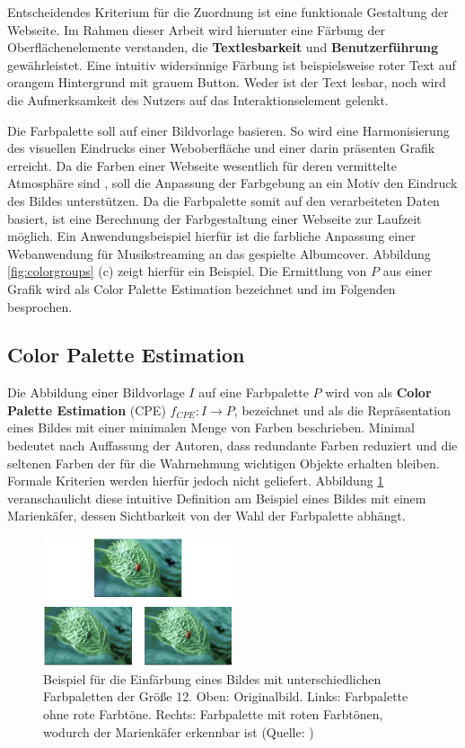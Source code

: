 Entscheidendes Kriterium für die Zuordnung  ist eine funktionale Gestaltung der Webseite. Im Rahmen dieser Arbeit wird hierunter eine Färbung der Oberflächenelemente verstanden, die \textbf{Textlesbarkeit} und \textbf{Benutzerführung} gewährleistet. Eine intuitiv widersinnige Färbung ist beispielsweise roter Text auf orangem Hintergrund mit grauem Button. Weder ist der Text lesbar, noch wird die Aufmerksamkeit des Nutzers auf das Interaktionselement gelenkt.

Die Farbpalette soll auf einer Bildvorlage basieren. So wird eine Harmonisierung des visuellen Eindrucks einer Weboberfläche und einer darin präsenten Grafik erreicht. Da die Farben einer Webseite wesentlich für deren vermittelte Atmosphäre sind \citep{webdesign}, soll die Anpassung der Farbgebung an ein Motiv den Eindruck des Bildes unterstützen. Da die Farbpalette somit auf den verarbeiteten Daten basiert, ist eine Berechnung der Farbgestaltung einer Webseite zur Laufzeit möglich. Ein Anwendungsbeispiel hierfür ist die farbliche Anpassung einer Webanwendung für Musikstreaming an das gespielte Albumcover. Abbildung \ref{fig:colorgroups} (c) zeigt hierfür ein Beispiel. Die Ermittlung von $P$ aus einer Grafik wird als Color Palette Estimation bezeichnet und im Folgenden besprochen.

\subsection{Color Palette Estimation}
\label{sec:cpe}

Die Abbildung einer Bildvorlage $I$ auf eine Farbpalette $P$ wird von \citet{acopa} als \textbf{Color Palette Estimation} (CPE) $f_{CPE}: I \to P$, bezeichnet und als die Repräsentation eines Bildes mit einer minimalen Menge von Farben beschrieben. \glqq{}Minimal\grqq{} bedeutet nach Auffassung der Autoren, dass redundante Farben reduziert und die seltenen Farben der für die Wahrnehmung wichtigen Objekte erhalten bleiben. Formale Kriterien werden hierfür jedoch nicht geliefert. Abbildung \ref{fig:ladybug} veranschaulicht diese intuitive Definition am Beispiel eines Bildes mit einem Marienkäfer, dessen Sichtbarkeit von der Wahl der Farbpalette abhängt.

\begin{figure}[h]
\centering
\includegraphics[width=0.5\textwidth]{img/ladybug.png}
\caption{Beispiel für die Einfärbung eines Bildes mit unterschiedlichen Farbpaletten der Größe 12. Oben: Originalbild. Links: Farbpalette ohne rote Farbtöne. Rechts: Farbpalette mit roten Farbtönen, wodurch der Marienkäfer erkennbar ist (Quelle: \citep{acopa})}
\label{fig:ladybug}
\end{figure}

